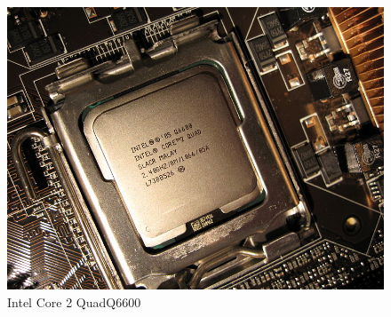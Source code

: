 \begin{figure}[htb]
	\centering
	\includegraphics[scale = 0.8]{Graphics/IntelCore_2_Q6600.jpeg}
	\caption{Intel Core 2 QuadQ6600}
	\label{fig:24}
\end{figure}
\newpage

